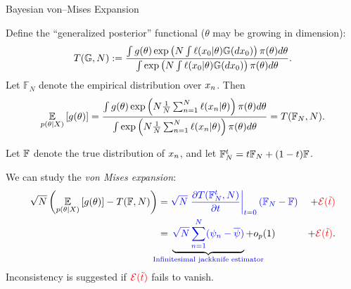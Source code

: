 \def\gdist{\mathbb{G}}
\def\fndist{\mathbb{F}_N}
\def\ftdist{\mathbb{F}_N^{\t}}
\def\fwdist{\mathbb{F}_{N}^{w}}
\def\T{T}   %
\def\Tlin{T_{\mathrm{lin}}} %
\def\t{t}   %
\def\g{g}   %
\def\xn{\x_{0}}   %
\def\prior{\pi}
\def\ttil{\tilde{\t}}   %



\begin{frame}[t]{Bayesian von--Mises Expansion}


\pause

Define the ``generalized posterior'' functional ($\theta$ may be growing in dimension):
%
\begin{align*}
    \T(\gdist, N) := \frac{
        \int \g(\theta) \exp\left( N \int \ell(\xn \vert \theta) \gdist(d\xn)\right)
            \prior(\theta) d\theta
    }
    {
    \int \exp\left( N \int \ell(\xn \vert \theta) \gdist(d\xn)\right)
        \prior(\theta) d\theta
    }.
\end{align*}
%
Let $\fndist$ denote the empirical distribution over $x_n$.  Then
%
\begin{align*}
    \expect{\post}{\g(\theta)} =
    \frac{
        \int \g(\theta) \exp\left( N \meann \ell(\x_n \vert \theta) \right)
            \prior(\theta) d\theta
    }
    {
    \int \exp\left( N \meann \ell(\x_n \vert \theta) \right)
        \prior(\theta) d\theta
    } = \T(\fndist, N).
\end{align*}
%
\pause
%
\hrulefill

Let $\mathbb{F}$ denote the true distribution of $x_n$, and
let $\ftdist  = \t \fndist + (1 - \t) \fdist$. 

We can study the \textit{von Mises expansion}:
%
\begin{align*}
    \sqrt{N} \left(\expect{\post}{\g(\theta)} - \T(\fdist, N) \right) ={}&
        \blue{\sqrt{N} \fracat{\partial \T(\ftdist, N)}{\partial \t}{\t = 0} (\fndist - \fdist)}
        & + \red{\err(\ttil)}
\\={}&
\undernote{
    \blue{\sqrt{N} \sumn (\infl_n - \overline{\infl})} }
    {\textrm{\blue{Infinitesimal jackknife estimator}}} + o_p(1) 
    & + \red{\err(\ttil)}.
\end{align*}
%
Inconsistency is suggested if $\red{\err(\ttil)}$ fails to vanish.
%
\end{frame}






